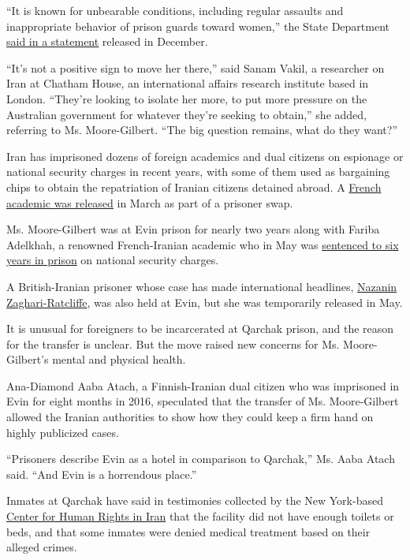 ``It is known for unbearable conditions, including regular assaults and
inappropriate behavior of prison guards toward women,'' the State
Department
\href{https://www.state.gov/this-week-in-iran-policy-december-2-6/}{said
in a statement} released in December.

``It's not a positive sign to move her there,'' said Sanam Vakil, a
researcher on Iran at Chatham House, an international affairs research
institute based in London. ``They're looking to isolate her more, to put
more pressure on the Australian government for whatever they're seeking
to obtain,'' she added, referring to Ms. Moore-Gilbert. ``The big
question remains, what do they want?''

Iran has imprisoned dozens of foreign academics and dual citizens on
espionage or national security charges in recent years, with some of
them used as bargaining chips to obtain the repatriation of Iranian
citizens detained abroad. A
\href{https://www.nytimes3xbfgragh.onion/2020/03/21/world/middleeast/prisoner-swap-france-iran.html}{French
academic was released} in March as part of a prisoner swap.

Ms. Moore-Gilbert was at Evin prison for nearly two years along with
Fariba Adelkhah, a renowned French-Iranian academic who in May was
\href{https://www.nytimes3xbfgragh.onion/2020/05/16/world/middleeast/fariba-adelkah-iran.html}{sentenced
to six years in prison} on national security charges.

A British-Iranian prisoner whose case has made international headlines,
\href{https://www.nytimes3xbfgragh.onion/2020/05/20/world/europe/iran-uk-nazanin-zaghari-ratcliffe.html}{Nazanin
Zaghari-Ratcliffe}, was also held at Evin, but she was temporarily
released in May.

It is unusual for foreigners to be incarcerated at Qarchak prison, and
the reason for the transfer is unclear. But the move raised new concerns
for Ms. Moore-Gilbert's mental and physical health.

Ana-Diamond Aaba Atach, a Finnish-Iranian dual citizen who was
imprisoned in Evin for eight months in 2016, speculated that the
transfer of Ms. Moore-Gilbert allowed the Iranian authorities to show
how they could keep a firm hand on highly publicized cases.

``Prisoners describe Evin as a hotel in comparison to Qarchak,'' Ms.
Aaba Atach said. ``And Evin is a horrendous place.''

Inmates at Qarchak have said in testimonies collected by the New
York-based
\href{https://iranhumanrights.org/2019/08/prisoners-in-irans-gharchak-prison-for-women-protest-inhumane-living-conditions/}{Center
for Human Rights in Iran} that the facility did not have enough toilets
or beds, and that some inmates were denied medical treatment based on
their alleged crimes.

